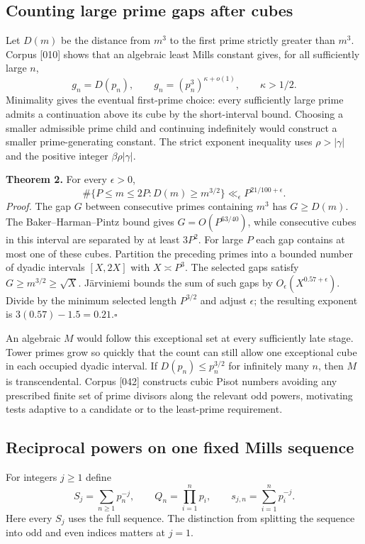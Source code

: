 \documentclass[11pt,a4paper,oneside,openany]{book}
\begin{document}
\subsection*{Counting large prime gaps after cubes}
Let $D(m)$ be the distance from $m^3$ to the first prime strictly greater than $m^3$. Corpus [010] shows that an algebraic least Mills constant gives, for all sufficiently large $n$,
\[
  g_n=D(p_n),\qquad g_n=(p_n^3)^{\kappa+o(1)},\qquad \kappa>1/2.
\]
Minimality gives the eventual first-prime choice: every sufficiently large prime admits a continuation above its cube by the short-interval bound. Choosing a smaller admissible prime child and continuing indefinitely would construct a smaller prime-generating constant. The strict exponent inequality uses $\rho>|\gamma|$ and the positive integer $\beta\rho|\gamma|$.

\textbf{Theorem 2.} For every $\epsilon>0$,
\[
 \#\{P\le m\le2P:D(m)\ge m^{3/2}\}\ll_{\epsilon} P^{21/100+\epsilon}.
\]
\textit{Proof.} The gap $G$ between consecutive primes containing $m^3$ has $G\ge D(m)$. The Baker--Harman--Pintz bound gives $G=O(P^{63/40})$, while consecutive cubes in this interval are separated by at least $3P^2$. For large $P$ each gap contains at most one of these cubes. Partition the preceding primes into a bounded number of dyadic intervals $[X,2X]$ with $X\asymp P^3$. The selected gaps satisfy $G\ge m^{3/2}\ge\sqrt X$. J\"arviniemi bounds the sum of such gaps by $O_{\epsilon}(X^{0.57+\epsilon})$. Divide by the minimum selected length $P^{3/2}$ and adjust $\epsilon$; the resulting exponent is $3(0.57)-1.5=0.21$.\hfill$\square$

An algebraic $M$ would follow this exceptional set at every sufficiently late stage. Tower primes grow so quickly that the count can still allow one exceptional cube in each occupied dyadic interval. If $D(p_n)\le p_n^{3/2}$ for infinitely many $n$, then $M$ is transcendental. Corpus [042] constructs cubic Pisot numbers avoiding any prescribed finite set of prime divisors along the relevant odd powers, motivating tests adaptive to a candidate or to the least-prime requirement.

\subsection*{Reciprocal powers on one fixed Mills sequence}
For integers $j\ge1$ define
\[
 S_j=\sum_{n\ge1}p_n^{-j},\qquad Q_n=\prod_{i=1}^np_i,
 \qquad s_{j,n}=\sum_{i=1}^np_i^{-j}.
\]
Here every $S_j$ uses the full sequence. The distinction from splitting the sequence into odd and even indices matters at $j=1$.
\end{document}
